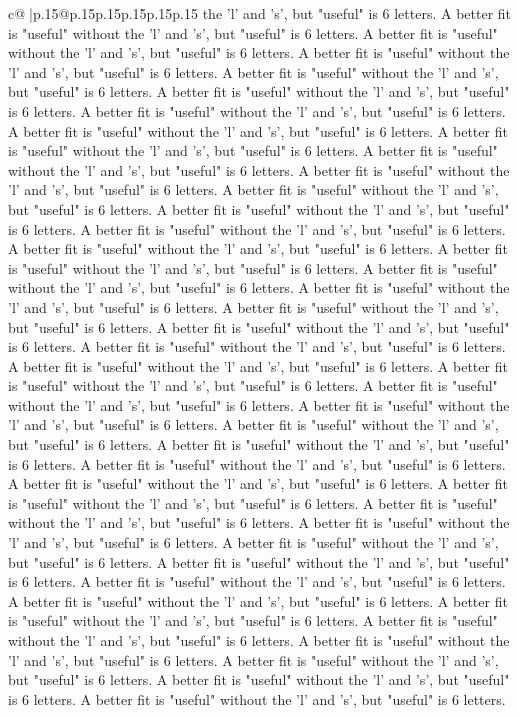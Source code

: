 \documentclass{article}
\begin{document}
{\begin{supertabular}{c@{$\;$}|p{.15\linewidth}@{}p{.15\linewidth}p{.15\linewidth}p{.15\linewidth}p{.15\linewidth}p{.15\linewidth}}
{{{the 'l' and 's', but "useful" is 6 letters. A better fit is "useful" without the 'l' and 's', but "useful" is 6 letters. A better fit is "useful" without the 'l' and 's', but "useful" is 6 letters. A better fit is "useful" without the 'l' and 's', but "useful" is 6 letters. A better fit is "useful" without the 'l' and 's', but "useful" is 6 letters. A better fit is "useful" without the 'l' and 's', but "useful" is 6 letters. A better fit is "useful" without the 'l' and 's', but "useful" is 6 letters. A better fit is "useful" without the 'l' and 's', but "useful" is 6 letters. A better fit is "useful" without the 'l' and 's', but "useful" is 6 letters. A better fit is "useful" without the 'l' and 's', but "useful" is 6 letters. A better fit is "useful" without the 'l' and 's', but "useful" is 6 letters. A better fit is "useful" without the 'l' and 's', but "useful" is 6 letters. A better fit is "useful" without the 'l' and 's', but "useful" is 6 letters. A better fit is "useful" without the 'l' and 's', but "useful" is 6 letters. A better fit is "useful" without the 'l' and 's', but "useful" is 6 letters. A better fit is "useful" without the 'l' and 's', but "useful" is 6 letters. A better fit is "useful" without the 'l' and 's', but "useful" is 6 letters. A better fit is "useful" without the 'l' and 's', but "useful" is 6 letters. A better fit is "useful" without the 'l' and 's', but "useful" is 6 letters. A better fit is "useful" without the 'l' and 's', but "useful" is 6 letters. A better fit is "useful" without the 'l' and 's', but "useful" is 6 letters. A better fit is "useful" without the 'l' and 's', but "useful" is 6 letters. A better fit is "useful" without the 'l' and 's', but "useful" is 6 letters. A better fit is "useful" without the 'l' and 's', but "useful" is 6 letters. A better fit is "useful" without the 'l' and 's', but "useful" is 6 letters. A better fit is "useful" without the 'l' and 's', but "useful" is 6 letters. A better fit is "useful" without the 'l' and 's', but "useful" is 6 letters. A better fit is "useful" without the 'l' and 's', but "useful" is 6 letters. A better fit is "useful" without the 'l' and 's', but "useful" is 6 letters. A better fit is "useful" without the 'l' and 's', but "useful" is 6 letters. A better fit is "useful" without the 'l' and 's', but "useful" is 6 letters. A better fit is "useful" without the 'l' and 's', but "useful" is 6 letters. A better fit is "useful" without the 'l' and 's', but "useful" is 6 letters. A better fit is "useful" without the 'l' and 's', but "useful" is 6 letters. A better fit is "useful" without the 'l' and 's', but "useful" is 6 letters. A better fit is "useful" without the 'l' and 's', but "useful" is 6 letters. A better fit is "useful" without the 'l' and 's', but "useful" is 6 letters. A better fit is "useful" without the 'l' and 's', but "useful" is 6 letters. A better fit is "useful" without the 'l' and 's', but "useful" is 6 letters. A better fit is "useful" without the 'l' and 's', but "useful" is 6 letters. A better fit is "useful" without the 'l' and 's', but "useful" is 6 letters. A better fit is "useful" without the 'l' and 's', but "useful" is 6 letters. }}}
\end{supertabular}}
\end{document}
